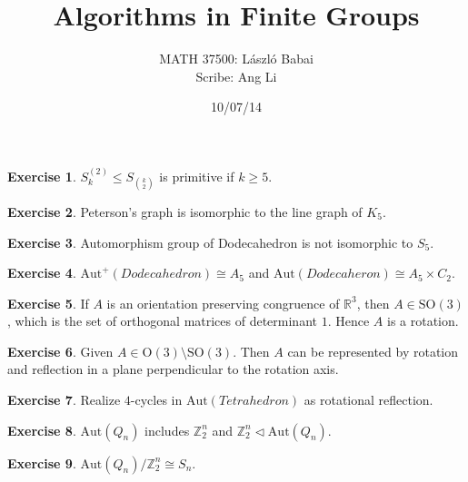\documentclass[12pt]{article}
\begin{document}
	\title{Algorithms in Finite Groups}
	\author{MATH 37500: L\'aszl\'o Babai \\
       	 Scribe: Ang Li} 
	\date{10/07/14}

	\maketitle

	\theoremstyle{definition}
	\newtheorem{ex}{Exercise}[section]
	\newtheorem{definition}[ex]{Definition}
	\setcounter{section}{1}

	\begin{ex}
		$S_k^{(2)} \leq S_{k \choose{2}}$ is primitive if $k \geq 5$.
	\end{ex}

	\begin{ex}
		Peterson's graph is isomorphic to the line graph of $K_5$.
	\end{ex}
	
	\begin{ex}
		Automorphism group of Dodecahedron is not isomorphic to $S_5$.
	\end{ex}
	
	\begin{ex}
		$\mathrm{Aut}^+(Dodecahedron) \cong A_5$ and $\mathrm{Aut}(Dodecaheron) \cong A_5 \times C_2$.
	\end{ex}
	
	\begin{ex}
		If $A$ is an orientation preserving congruence of $\mathbb{R}^3$, then $A \in \mathrm{SO}(3)$, which is the set of orthogonal matrices of determinant $1$. Hence $A$ is a rotation.
	\end{ex}
	
	\begin{ex}
		Given $A \in \mathrm{O}(3) \setminus \mathrm{SO}(3)$. Then $A$ can be represented by rotation and reflection in a plane perpendicular to the rotation axis.
	\end{ex}
	
	\begin{ex}
		Realize $4$-cycles in $\mathrm{Aut}(Tetrahedron)$ as rotational reflection.
	\end{ex}
	
	\begin{ex}
		$\mathrm{Aut}(Q_n)$ includes $\mathbb{Z}_2^n$ and $\mathbb{Z}_2^n \lhd \mathrm{Aut}(Q_n)$.
	\end{ex}
	
	\begin{ex}
		$\mathrm{Aut}(Q_n) / \mathbb{Z}_2^n \cong S_n$.
	\end{ex}
	
\end{document}
